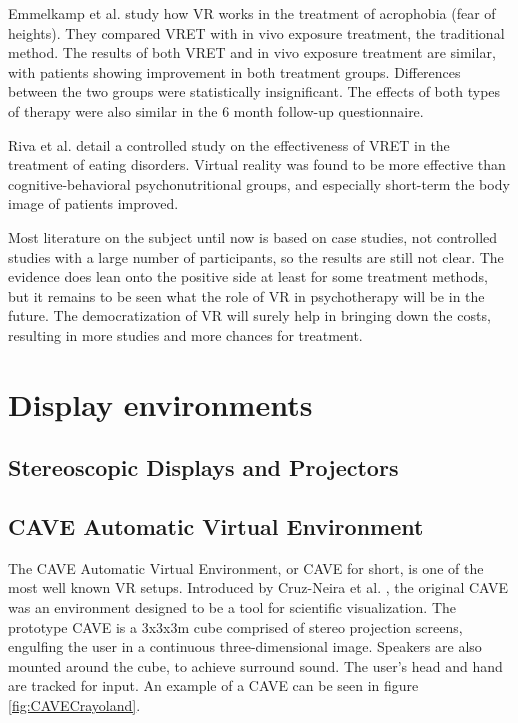 \documentclass[12pt,a4paper,oneside,pdftex]{report}
\begin{document}
Emmelkamp et al. \cite{emmelkamp2002virtual} study how VR works in the treatment of acrophobia (fear of heights). They compared VRET with in vivo exposure treatment, the traditional method. The results of both VRET and in vivo exposure treatment are similar, with patients showing improvement in both treatment groups. Differences between the two groups were statistically insignificant. The effects of both types of therapy were also similar in the 6 month follow-up questionnaire.

Riva et al. \cite{riva2002virtual} detail a controlled study on the effectiveness of VRET in the treatment of eating disorders. Virtual reality was found to be more effective than cognitive-behavioral psychonutritional groups, and especially short-term the body image of patients improved.

Most literature on the subject until now is based on case studies, not controlled studies with a large number of participants, so the results are still not clear. The evidence does lean onto the positive side at least for some treatment methods, but it remains to be seen what the role of VR in psychotherapy will be in the future. The democratization of VR will surely help in bringing down the costs, resulting in more studies and more chances for treatment.



\section{Display environments}
\label{section:displayenvironments}

\subsection{Stereoscopic Displays and Projectors}
\label{subsection:displayenvironments:stereoscopic}


\subsection{CAVE Automatic Virtual Environment}
\label{subsection:displayenvironments:cave}

The CAVE Automatic Virtual Environment, or CAVE for short, is one of the most well known VR setups. Introduced by Cruz-Neira et al. \cite{CAVE1, CAVE2}, the original CAVE was an environment designed to be a tool for scientific visualization. The prototype CAVE is a 3x3x3m cube comprised of stereo projection screens, engulfing the user in a continuous three-dimensional image. Speakers are also mounted around the cube, to achieve surround sound. The user's head and hand are tracked for input. An example of a CAVE can be seen in figure \ref{fig:CAVECrayoland}.
\end{document}
